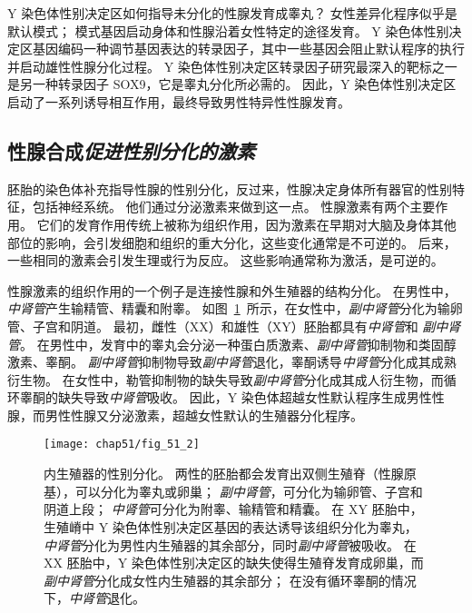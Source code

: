 Y 染色体性别决定区如何指导未分化的性腺发育成睾丸？
女性差异化程序似乎是默认模式；
模式基因启动身体和性腺沿着女性特定的途径发育。
Y 染色体性别决定区基因编码一种调节基因表达的转录因子，其中一些基因会阻止默认程序的执行并启动雄性性腺分化过程。
Y 染色体性别决定区转录因子研究最深入的靶标之一是另一种转录因子 SOX9，它是睾丸分化所必需的。
因此，Y 染色体性别决定区启动了一系列诱导相互作用，最终导致男性特异性性腺发育。



\subsection{性腺合成\textit{促进性别分化的激素}}

胚胎的染色体补充指导性腺的性别分化，反过来，性腺决定身体所有器官的性别特征，包括神经系统。
他们通过分泌激素来做到这一点。
性腺激素有两个主要作用。
它们的发育作用传统上被称为组织作用，因为激素在早期对大脑及身体其他部位的影响，会引发细胞和组织的重大分化，这些变化通常是不可逆的。
后来，一些相同的激素会引发生理或行为反应。
这些影响通常称为激活，是可逆的。


性腺激素的组织作用的一个例子是连接性腺和外生殖器的结构分化。
在男性中，\textit{中肾管}产生输精管、精囊和附睾。
如图~\ref{fig:51_2}~所示，在女性中，\textit{副中肾管}分化为输卵管、子宫和阴道。
最初，雌性（XX）和雄性（XY）胚胎都具有\textit{中肾管}和 \textit{副中肾管}。
在男性中，发育中的睾丸会分泌一种蛋白质激素、\textit{副中肾管}抑制物和类固醇激素、睾酮。
\textit{副中肾管}抑制物导致\textit{副中肾管}退化，睾酮诱导\textit{中肾管}分化成其成熟衍生物。
在女性中，勒管抑制物的缺失导致\textit{副中肾管}分化成其成人衍生物，而循环睾酮的缺失导致\textit{中肾管}吸收。
因此，Y 染色体超越女性默认程序生成男性性腺，而男性性腺又分泌激素，超越女性默认的生殖器分化程序。


\begin{figure}[htbp]
	\centering
	\texttt{[image: chap51/fig\_51\_2]}
	\caption{内生殖器的性别分化。
		两性的胚胎都会发育出双侧生殖脊（性腺原基），可以分化为睾丸或卵巢； \textit{副中肾管}，可分化为输卵管、子宫和阴道上段；
		\textit{中肾管}可分化为附睾、输精管和精囊。
		在 XY 胚胎中，生殖嵴中 Y 染色体性别决定区基因的表达诱导该组织分化为睾丸，\textit{中肾管}分化为男性内生殖器的其余部分，同时\textit{副中肾管}被吸收。
		在 XX 胚胎中，Y 染色体性别决定区的缺失使得生殖脊发育成卵巢，而\textit{副中肾管}分化成女性内生殖器的其余部分；
		在没有循环睾酮的情况下，\textit{中肾管}退化\cite{wilhelm2007sex}。}
	\label{fig:51_2}
\end{figure}


